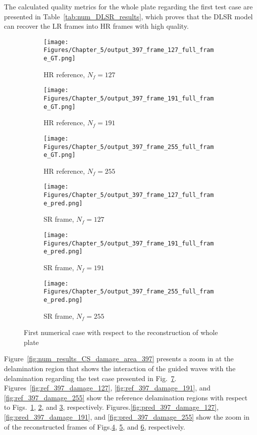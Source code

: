 The calculated quality metrics for the whole plate regarding the first test case are presented in Table~\ref{tab:num_DLSR_results}, which proves that the DLSR model can recover the LR frames into HR frames with high quality.
\begin{figure}[!h]
	\centering
	\begin{subfigure}[b]{.32\textwidth}
		\centering
		\texttt{[image: Figures/Chapter\_5/output\_397\_frame\_127\_full\_frame\_GT.png]}
		\caption{HR reference, $N_f=127$}
		\label{fig:ref_397_full_127}
	\end{subfigure}
	\begin{subfigure}[b]{.32\textwidth}
		\centering
		\texttt{[image: Figures/Chapter\_5/output\_397\_frame\_191\_full\_frame\_GT.png]}
		\caption{HR reference, $N_f=191$}
		\label{fig:ref_397_full_191}
	\end{subfigure}
	\begin{subfigure}[b]{.32\textwidth}
		\centering
		\texttt{[image: Figures/Chapter\_5/output\_397\_frame\_255\_full\_frame\_GT.png]}
		\caption{HR reference, $N_f=255$}
		\label{fig:ref_397_full_255}	
	\end{subfigure}
		\begin{subfigure}[b]{.32\textwidth}
		\centering
		\texttt{[image: Figures/Chapter\_5/output\_397\_frame\_127\_full\_frame\_pred.png]}
		\caption{SR frame, $N_f=127$}
		\label{fig:pred_397_full_127}
	\end{subfigure}
	\begin{subfigure}[b]{.32\textwidth}
		\centering
		\texttt{[image: Figures/Chapter\_5/output\_397\_frame\_191\_full\_frame\_pred.png]}
		\caption{SR frame, $N_f=191$}
		\label{fig:pred_397_full_191}
	\end{subfigure}
	\begin{subfigure}[b]{.32\textwidth}
		\centering
		\texttt{[image: Figures/Chapter\_5/output\_397\_frame\_255\_full\_frame\_pred.png]}
		\caption{SR frame, $N_f=255$}
		\label{fig:pred_397_full_255}	
	\end{subfigure}
	\caption{First numerical case with respect to the reconstruction of whole plate}
	\label{fig:num_results_CS_397}
\end{figure}

Figure~\ref{fig:num_results_CS_damage_area_397} presents a zoom in at the delamination region that shows the interaction of the guided waves with the delamination regarding the test case presented in Fig.~\ref{fig:num_results_CS_397}.
Figures~\ref{fig:ref_397_damage_127}, \ref{fig:ref_397_damage_191}, and \ref{fig:ref_397_damage_255} show the reference delamination regions with respect to Figs.~\ref{fig:ref_397_full_127}, \ref{fig:ref_397_full_191}, and \ref{fig:ref_397_full_255}, respectively.
Figures.\ref{fig:pred_397_damage_127}, \ref{fig:pred_397_damage_191}, and \ref{fig:pred_397_damage_255} show the zoom in of the reconstructed frames of Figs.\ref{fig:pred_397_full_127}, \ref{fig:pred_397_full_191}, and \ref{fig:pred_397_full_255}, respectively.

